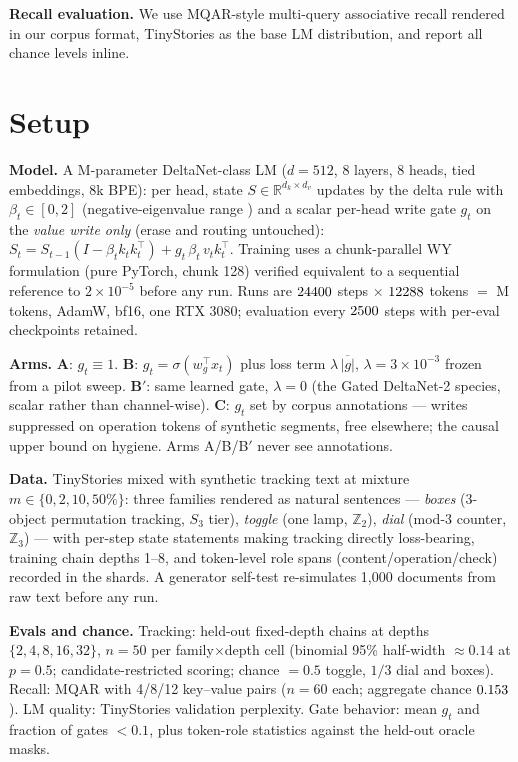 \documentclass[10pt]{article}
\newcommand{\gt}{g_t}
\begin{document}
\textbf{Recall evaluation.} We use MQAR-style multi-query associative recall \citep{arora2023zoology}
rendered in our corpus format, TinyStories \citep{eldan2023tinystories} as the base LM distribution,
and report all chance levels inline.

\section{Setup}\label{sec:setup}
\textbf{Model.} A \tgParamsM{}M-parameter DeltaNet-class LM ($d{=}512$, 8 layers, 8 heads, tied
embeddings, 8k BPE): per head, state $S\in\mathbb{R}^{d_k\times d_v}$ updates by the delta rule with
$\beta_t\in[0,2]$ (negative-eigenvalue range \citep{grazzi2025negative}) and a scalar per-head write
gate $\gt$ on the \emph{value write only} (erase and routing untouched):
$S_t = S_{t-1}\!\left(I-\beta_t k_t k_t^{\top}\right) + \gt\,\beta_t\, v_t k_t^{\top}$.
Training uses a chunk-parallel WY formulation (pure PyTorch, chunk 128) verified equivalent to a
sequential reference to $2\times10^{-5}$ before any run. Runs are $24400$ steps
$\times$ $12288$ tokens $=$ \tgTrainTokensM{}M tokens, AdamW, bf16, one RTX 3080;
evaluation every $2500$ steps with per-eval checkpoints retained.

\textbf{Arms.} \textbf{A}: $\gt\equiv1$. \textbf{B}: $\gt=\sigma(w_g^\top x_t)$ plus loss term
$\lambda\,\overline{|g|}$, $\lambda{=}3\times10^{-3}$ frozen from a pilot sweep. \textbf{B$'$}: same
learned gate, $\lambda{=}0$ (the Gated DeltaNet-2 species, scalar rather than channel-wise).
\textbf{C}: $\gt$ set by corpus annotations --- writes suppressed on operation tokens of synthetic
segments, free elsewhere; the causal upper bound on hygiene. Arms A/B/B$'$ never see annotations.

\textbf{Data.} TinyStories mixed with synthetic tracking text at mixture
$m\in\{0,2,10,50\%\}$: three families rendered as natural sentences ---
\emph{boxes} (3-object permutation tracking, $S_3$ tier), \emph{toggle} (one lamp,
$\mathbb{Z}_2$), \emph{dial} (mod-3 counter, $\mathbb{Z}_3$) --- with per-step state statements
making tracking directly loss-bearing, training chain depths 1--8, and token-level role spans
(content/operation/check) recorded in the shards. A generator self-test re-simulates 1{,}000
documents from raw text before any run.

\textbf{Evals and chance.} Tracking: held-out fixed-depth chains at depths $\{2,4,8,16,32\}$,
$n{=}50$ per family$\times$depth cell (binomial 95\% half-width $\approx0.14$ at $p{=}0.5$;
candidate-restricted scoring; chance $=0.5$ toggle, $1/3$ dial and boxes). Recall: MQAR
\citep{arora2023zoology} with 4/8/12 key--value pairs ($n{=}60$ each; aggregate chance
$0.153$). LM quality: TinyStories validation perplexity. Gate behavior: mean $\gt$ and
fraction of gates $<0.1$, plus token-role statistics against the held-out oracle masks.
\end{document}
